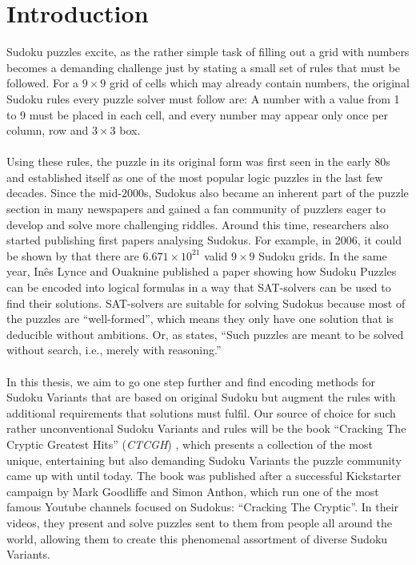 \chapter{Introduction}

Sudoku puzzles excite, as the rather simple task of filling out a grid with numbers becomes a demanding challenge just by stating a small set of rules that must be followed. For a $9 \times 9$ grid of cells which may already contain numbers, the original Sudoku rules every puzzle solver must follow are: A number with a value from 1 to 9 must be placed in each cell, and every number may appear only once per column, row and $3\times3$ box.\\
\\
Using these rules, the puzzle in its original form was first seen in the early 80s and established itself as one of the most popular logic puzzles in the last few decades. Since the mid-2000s, Sudokus also became an inherent part of the puzzle section in many newspapers and gained a fan community of puzzlers eager to develop and solve more challenging riddles. Around this time, researchers also started publishing first papers analysing Sudokus. For example, in 2006, it could be shown by \cite{Felgenhauer2006MathematicsOS} that there are $6.671\times 10^{21}$ valid $9\times 9$ Sudoku grids. In the same year, Inês Lynce and Ouaknine published a paper \cite{Lynce2006SudokuAsASATProblem} showing how Sudoku Puzzles can be encoded into logical formulas in a way that SAT-solvers can be used to find their solutions. SAT-solvers are suitable for solving Sudokus because most of the puzzles are “well-formed”, which means they only have one solution that is deducible without ambitions. Or, as \cite{Lynce2006SudokuAsASATProblem} states, ``Such puzzles are meant to be solved without search, i.e., merely with reasoning.''\\
\\
In this thesis, we aim to go one step further and find encoding methods for Sudoku Variants that are based on original Sudoku but augment the rules with additional requirements that solutions must fulfil. Our source of choice for such rather unconventional Sudoku Variants and rules will be the book ``Cracking The Cryptic Greatest Hits'' (\emph{CTCGH}) \cite{CrackingTheCryptic2021}, which presents a collection of the most unique, entertaining but also demanding Sudoku Variants the puzzle community came up with until today. The book was published after a successful Kickstarter campaign by Mark Goodliffe and Simon Anthon, which run one of the most famous Youtube channels focused on Sudokus: ``Cracking The Cryptic''\cite{ChannelCrackingTheCryptic}. In their videos, they present and solve puzzles sent to them from people all around the world, allowing them to create this phenomenal assortment of diverse Sudoku Variants.\\
